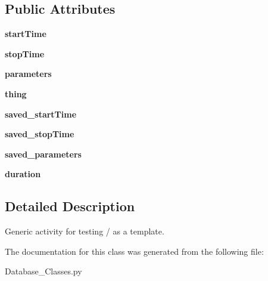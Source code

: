 \subsection*{Public Attributes}
\begin{DoxyCompactItemize}
\item 
\hypertarget{classDatabase__Classes_1_1Activity_a4304d966ad1a565b353c37e221f8550a}{{\bfseries start\-Time}}\label{classDatabase__Classes_1_1Activity_a4304d966ad1a565b353c37e221f8550a}

\item 
\hypertarget{classDatabase__Classes_1_1Activity_a2dd5e500b88ceced9a749435fa6058b3}{{\bfseries stop\-Time}}\label{classDatabase__Classes_1_1Activity_a2dd5e500b88ceced9a749435fa6058b3}

\item 
\hypertarget{classDatabase__Classes_1_1Activity_a6ab830b6302d0a004977142fe18b0aff}{{\bfseries parameters}}\label{classDatabase__Classes_1_1Activity_a6ab830b6302d0a004977142fe18b0aff}

\item 
\hypertarget{classDatabase__Classes_1_1Activity_a41af32da7c5e4ce656188b809198d535}{{\bfseries thing}}\label{classDatabase__Classes_1_1Activity_a41af32da7c5e4ce656188b809198d535}

\item 
\hypertarget{classDatabase__Classes_1_1Activity_a71776c12e44d9f064f4c30a5a170ab9d}{{\bfseries saved\-\_\-start\-Time}}\label{classDatabase__Classes_1_1Activity_a71776c12e44d9f064f4c30a5a170ab9d}

\item 
\hypertarget{classDatabase__Classes_1_1Activity_a7e5e0fcdeae75539c0fcfc2a6788d69b}{{\bfseries saved\-\_\-stop\-Time}}\label{classDatabase__Classes_1_1Activity_a7e5e0fcdeae75539c0fcfc2a6788d69b}

\item 
\hypertarget{classDatabase__Classes_1_1Activity_ad16876c648873ca8bf1f0c6d13a79951}{{\bfseries saved\-\_\-parameters}}\label{classDatabase__Classes_1_1Activity_ad16876c648873ca8bf1f0c6d13a79951}

\item 
\hypertarget{classDatabase__Classes_1_1Activity_a7e6a413c84129b8b71839ee3a86c8bed}{{\bfseries duration}}\label{classDatabase__Classes_1_1Activity_a7e6a413c84129b8b71839ee3a86c8bed}

\end{DoxyCompactItemize}


\subsection{Detailed Description}
Generic activity for testing / as a template. 

The documentation for this class was generated from the following file\-:\begin{DoxyCompactItemize}
\item 
Database\-\_\-\-Classes.\-py\end{DoxyCompactItemize}
